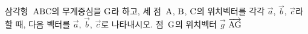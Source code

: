삼각형~$\mathrm{ABC}$의 무게중심을 $\mathrm{G}$라 하고, 세 점~$\mathrm{A}$, $\mathrm{B}$, $\mathrm{C}$의 위치벡터를 각각 $\vec{a}$, $\vec{b}$, $\vec{c}$라 할 때, 다음 벡터를 $\vec{a}$, $\vec{b}$, $\vec{c}$로 나타내시오.
 점~$\mathrm{G}$의 위치벡터 $\vec{g}$
 $\overrightarrow{\mathrm{AG}}$
